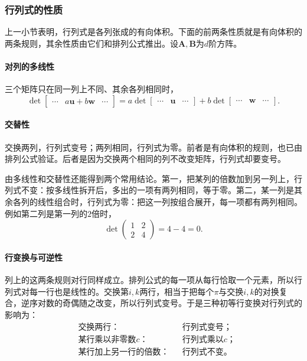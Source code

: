 \subsubsection{行列式的性质}

上一小节表明，行列式是各列张成的有向体积。下面的前两条性质就是有向体积的两条规则，其余性质由它们和排列公式推出。设$\bm A,\bm B$为$d$阶方阵。

\paragraph{对列的多线性}
三个矩阵只在同一列上不同、其余各列相同时，
\[
 \det\begin{bmatrix}\cdots&a\bm u+b\bm w&\cdots\end{bmatrix}
 =a\det\begin{bmatrix}\cdots&\bm u&\cdots\end{bmatrix}
 +b\det\begin{bmatrix}\cdots&\bm w&\cdots\end{bmatrix}.
\]

\paragraph{交替性}
交换两列，行列式变号；两列相同，行列式为零。前者是有向体积的规则，也已由排列公式验证。后者是因为交换两个相同的列不改变矩阵，行列式却要变号。

由多线性和交替性还能得到两个常用结论。第一，把某列的倍数加到另一列上，行列式不变：按多线性拆开后，多出的一项有两列相同，等于零。第二，某一列是其余各列的线性组合时，行列式为零：把这一列按组合展开，每一项都有两列相同。例如第二列是第一列的$2$倍时，
\[
 \det\begin{pmatrix}1&2\\2&4\end{pmatrix}=4-4=0.
\]

\paragraph{行变换与可逆性}
列上的这两条规则对行同样成立。排列公式的每一项从每行恰取一个元素，所以行列式对每一行也是线性的。交换第$i,k$两行，相当于把每个$\pi$与交换$i,k$的对换复合，逆序对数的奇偶随之改变，所以行列式变号。于是三种初等行变换对行列式的影响为：
\[
 \begin{aligned}
 &\text{交换两行：}&&\text{行列式变号；}\\
 &\text{某行乘以非零数}c\text{：}&&\text{行列式乘以}c\text{；}\\
 &\text{某行加上另一行的倍数：}&&\text{行列式不变。}
 \end{aligned}
\]

